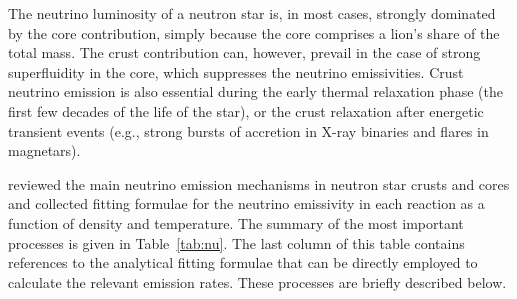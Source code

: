 \documentclass[smallextended]{svjour3}       %
\begin{document}
The neutrino luminosity of a neutron star is, in most cases,
strongly dominated by the core contribution, simply because
the core comprises a lion's share of the total mass. The
crust contribution can, however, prevail in the case of
strong superfluidity in the core, which suppresses the
neutrino emissivities. Crust neutrino emission is also
essential during the early thermal relaxation phase (the
first few decades of the life of the star), or the crust
relaxation after energetic transient events (e.g., strong
bursts of accretion in X-ray binaries and flares in
magnetars).

\citet{YKGH01} reviewed the main neutrino emission
mechanisms in neutron star crusts and cores and collected
fitting formulae for the neutrino emissivity in each reaction as 
a function of density and temperature. The
summary of the most important processes is given in
Table~\ref{tab:nu}. The last column of this table contains
references to the analytical fitting formulae that can be
directly employed to calculate the relevant emission rates.
These processes are briefly described below.
\end{document}
